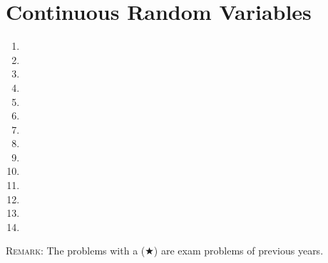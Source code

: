 \documentclass[a4paper,titlepage]{article}
\begin{document}
\section{Continuous Random Variables}
\begin{enumerate}[leftmargin=*,resume]
\item {}
\item {}
\item {}
\item {}
\item {}
\item {}
\item {}
\item {}
\item {}
\item {}
\item {}
\item {}
\item {}
\item {}
\end{enumerate}

\vspace{2cm}

\textsc{Remark}: The problems with a ($\bigstar$) are exam problems of previous years.
\end{document}
